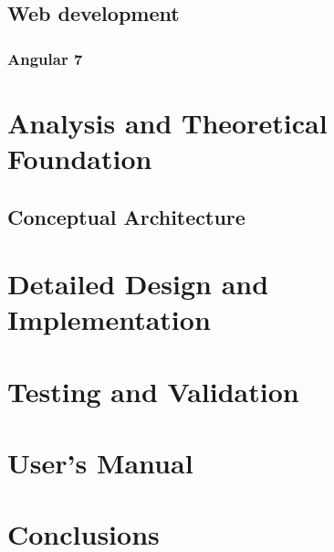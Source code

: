 \documentclass[12pt,a4paper,twoside]{report}
\begin{document}
\section{Web development}
\subsection{Angular 7}


\chapter{Analysis and Theoretical Foundation}

\section{Conceptual Architecture}


\chapter{Detailed Design and Implementation}



\chapter{Testing and Validation}



\chapter{User's Manual}



\chapter{Conclusions}






\end{document}
